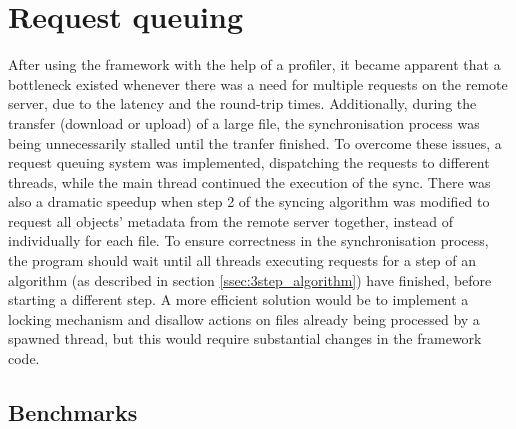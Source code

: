 \section{Request queuing}
  After using the framework with the help of a profiler, it became apparent that a bottleneck existed whenever there was a need for multiple requests on the remote server, due to the latency and the round-trip times. Additionally, during the transfer (download or upload) of a large file, the synchronisation process was being unnecessarily stalled until the tranfer finished. To overcome these issues, a request queuing system was implemented, dispatching the requests to different threads, while the main thread continued the execution of the sync. There was also a dramatic speedup when step 2 of the syncing algorithm was modified to request all objects' metadata from the remote server together, instead of individually for each file. To ensure correctness in the synchronisation process, the program should wait until all threads executing requests for a step of an algorithm (as described in section \ref{ssec:3step_algorithm}) have finished, before starting a different step. A more efficient solution would be to implement a locking mechanism and disallow actions on files already being processed by a spawned thread, but this would require substantial changes in the framework code.
  \subsection{Benchmarks}
